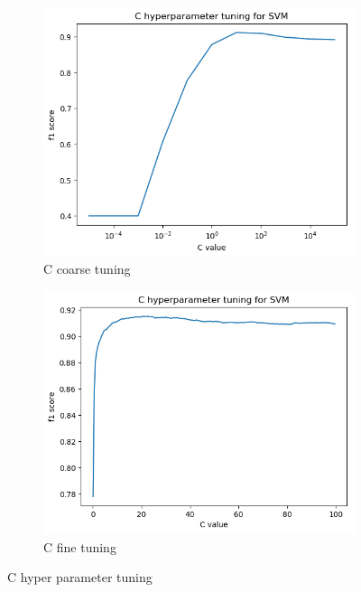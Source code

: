 \documentclass[12pt]{article}
\begin{document}
\begin{figure}[h]
\centering
\begin{subfigure}{.5\textwidth}
  \centering
  \includegraphics[width=.6\linewidth]{Cross_valid_plots/SVM_C_hyper_fig_coarse.png}
  \caption{C coarse tuning}
  \label{fig:sub1}
\end{subfigure}%
\begin{subfigure}{.5\textwidth}
  \centering
  \includegraphics[width=.6\linewidth]{Cross_valid_plots/SVM_C_hyper_fig_fine.png}
  \caption{C fine tuning}
  \label{fig:sub2}
\end{subfigure}
\caption{C hyper parameter tuning}
\label{fig:test}
\end{figure}

\newpage
\end{document}
